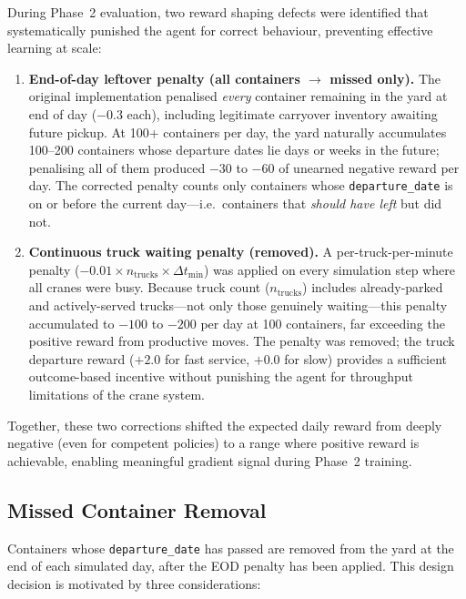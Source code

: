 During Phase~2 evaluation, two reward shaping defects were identified that systematically punished the agent for correct behaviour, preventing effective learning at scale:

\begin{enumerate}
  \item \textbf{End-of-day leftover penalty (all containers $\to$ missed only).}
    The original implementation penalised \emph{every} container remaining in the yard at end of day ($-0.3$ each), including legitimate carryover inventory awaiting future pickup.
    At 100+ containers per day, the yard naturally accumulates 100--200 containers whose departure dates lie days or weeks in the future; penalising all of them produced $-30$ to $-60$ of unearned negative reward per day.
    The corrected penalty counts only containers whose \texttt{departure\_date} is on or before the current day---i.e.\ containers that \emph{should have left} but did not.

  \item \textbf{Continuous truck waiting penalty (removed).}
    A per-truck-per-minute penalty ($-0.01 \times n_\text{trucks} \times \Delta t_\text{min}$) was applied on every simulation step where all cranes were busy.
    Because truck count ($n_\text{trucks}$) includes already-parked and actively-served trucks---not only those genuinely waiting---this penalty accumulated to $-100$ to $-200$ per day at 100 containers, far exceeding the positive reward from productive moves.
    The penalty was removed; the truck departure reward ($+2.0$ for fast service, $+0.0$ for slow) provides a sufficient outcome-based incentive without punishing the agent for throughput limitations of the crane system.
\end{enumerate}

Together, these two corrections shifted the expected daily reward from deeply negative (even for competent policies) to a range where positive reward is achievable, enabling meaningful gradient signal during Phase~2 training.

\subsection{Missed Container Removal}
\label{app:reward:missed-removal}

Containers whose \texttt{departure\_date} has passed are removed from the yard at the end of each simulated day, after the EOD penalty has been applied.
This design decision is motivated by three considerations:


